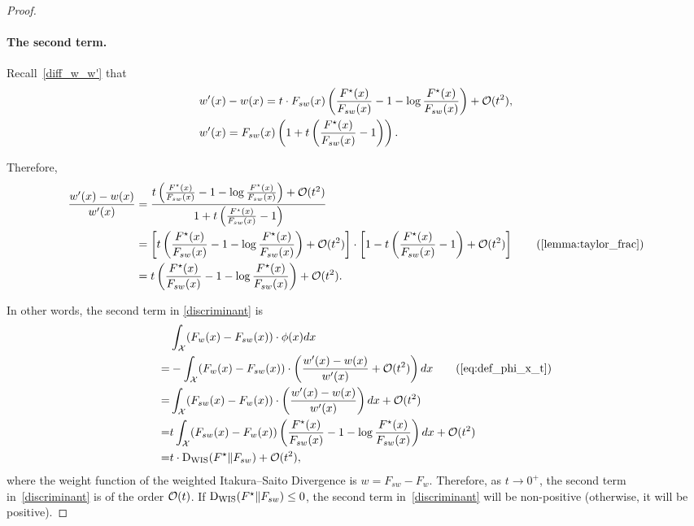 \begin{proof}
\paragraph{The second term.}

Recall~\cref{diff_w_w'} that
\begin{align*}
    & w'(x)-w(x) = t \cdot F_{sw}(x) \left(\frac{F^\star(x)}{F_{sw}(x)} - 1 - \log \frac{F^\star(x)}{F_{sw}(x)} \right) + \mathcal{O} (t^2), \\ & w'(x)= F_{sw}(x) \left( 1 + t\left( \frac{F^\star(x)}{F_{sw}(x)} - 1 \right) \right).
\end{align*}

Therefore,
\begin{align*}
    \frac{w'(x)-w(x)}{w'(x)} & =\frac{t \left(\frac{F^\star(x)}{F_{sw}(x)} - 1 - \log \frac{F^\star(x)}{F_{sw}(x)} \right) + \cO (t^2)}{1 + t\left( \frac{F^\star(x)}{F_{sw}(x)} - 1 \right)} 
    \\ & = \left[ t \left(\frac{F^\star(x)}{F_{sw}(x)} - 1 - \log \frac{F^\star(x)}{F_{sw}(x)} \right) + \cO (t^2) \right] \cdot \left[ 1-t\left( \frac{F^\star(x)}{F_{sw}(x)} - 1 \right) + \cO (t^2) \right] \tag{\cref{lemma:taylor_frac}}
    \\ & = t \left(\frac{F^\star(x)}{F_{sw}(x)} - 1 - \log \frac{F^\star(x)}{F_{sw}(x)} \right) + \cO (t^2).
\end{align*}

In other words, the second term in \eqref{discriminant} is
\begin{align*}
& \int_{\cX} (F_w(x) - F_{sw}(x)) \cdot \phi(x) d x 
\\ = & -\int_{\cX} (F_w(x) - F_{sw}(x)) \cdot \left(\frac{w'(x)-w(x)}{w'(x)} + \cO (t^2)\right) d x \tag{\cref{eq:def_phi_x_t}} 
\\ = & \int_{\cX} (F_{sw}(x) - F_w(x)) \cdot \left(\frac{w'(x)-w(x)}{w'(x)} \right) d x + \cO (t^2) 
\\ = & t\int_{\cX} (F_{sw}(x) - F_w(x)) \left(\frac{F^\star(x)}{F_{sw}(x)} - 1 - \log \frac{F^\star(x)}{F_{sw}(x)} \right) d x + \cO (t^2) 
\\ = & t \cdot \wis(F^\star \| F_{sw}) + \cO (t^2),
\end{align*}
where the weight function of the weighted Itakura–Saito Divergence is $w=F_{sw} - F_w$.
Therefore, as $t \to 0^+$, the second term in~\eqref{discriminant} is of the order $\mathcal{O} (t)$.
If $\mathrm{D}_{\mathrm{WIS}}(F^\star \| F_{sw}) \le 0$, the second term in~\eqref{discriminant} will be non-positive (otherwise, it will be positive).





\end{proof}
